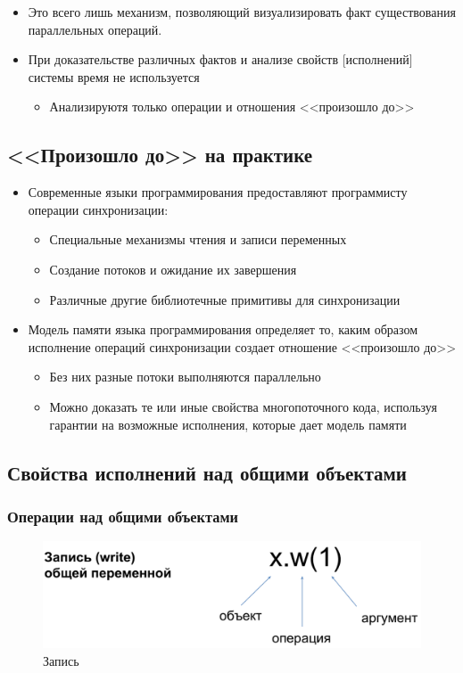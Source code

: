 \documentclass[10pt,a4paper,oneside,titlepage]{article}
\theoremstyle{plain}
\theoremstyle{defenition}
\begin{document}
\begin{itemize}
	\item Это всего лишь механизм, позволяющий визуализировать факт существования параллельных операций.
	\item При доказательстве различных фактов и анализе свойств [исполнений] системы время не используется
	\begin{itemize}
		\item Анализируютя только операции и отношения <<произошло до>>
	\end{itemize}
\end{itemize}

\subsection{<<Произошло до>> на практике}
\begin{itemize}
	\item Современные языки программирования предоставляют программисту операции синхронизации:
	\begin{itemize}
		\item Специальные механизмы чтения и записи переменных
		\item Создание потоков и ожидание их завершения
		\item Различные другие библиотечные примитивы для синхронизации
	\end{itemize}
    \item Модель памяти языка программирования определяет то, каким образом исполнение операций синхронизации создает отношение <<произошло до>>
    \begin{itemize}
    	\item Без них разные потоки выполняются параллельно
    	\item Можно доказать те или иные свойства многопоточного кода, используя гарантии на возможные исполнения, которые дает модель памяти
    \end{itemize}
\end{itemize}

\subsection{Свойства исполнений над общими объектами}
\subsubsection{Операции над общими объектами}
\begin{figure}[h!]
	\centering
	\includegraphics[width=0.6\linewidth]{pictures/Write}
	\caption{Запись}
	\label{fig:write}
\end{figure}
\end{document}

